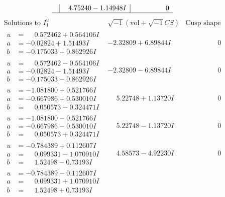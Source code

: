 \documentclass[1p]{elsarticle_modified}
\theoremstyle{definition}
\newcommand{\I}{\sqrt{-1}}
\begin{document}
$$\begin{array}{c|c|c}
 & \phantom{-}4.75240 - 1.14948 I & \phantom{-0.000000 } 0\\
 \hline 
 \end{array}$$\newpage$$\begin{array}{c|c|c}  
\text{Solutions to }I^u_{1}& \I (\text{vol} + \sqrt{-1}CS) & \text{Cusp shape}\\
 \hline 
\begin{aligned}
u &= \phantom{-}0.572462 + 0.564106 I \\
a &= -0.02824 + 1.51493 I \\
b &= -0.175033 + 0.862926 I\end{aligned}
 & -2.32809 + 6.89844 I & \phantom{-0.000000 } 0 \\ \hline\begin{aligned}
u &= \phantom{-}0.572462 - 0.564106 I \\
a &= -0.02824 - 1.51493 I \\
b &= -0.175033 - 0.862926 I\end{aligned}
 & -2.32809 - 6.89844 I & \phantom{-0.000000 } 0 \\ \hline\begin{aligned}
u &= -1.081800 + 0.521766 I \\
a &= -0.667986 + 0.530010 I \\
b &= \phantom{-}0.050573 - 0.324471 I\end{aligned}
 & \phantom{-}5.22748 + 1.13720 I & \phantom{-0.000000 } 0 \\ \hline\begin{aligned}
u &= -1.081800 - 0.521766 I \\
a &= -0.667986 - 0.530010 I \\
b &= \phantom{-}0.050573 + 0.324471 I\end{aligned}
 & \phantom{-}5.22748 - 1.13720 I & \phantom{-0.000000 } 0 \\ \hline\begin{aligned}
u &= -0.784389 + 0.112607 I \\
a &= \phantom{-}0.099331 - 1.070910 I \\
b &= \phantom{-}1.52498 - 0.73193 I\end{aligned}
 & \phantom{-}4.58573 - 4.92230 I & \phantom{-0.000000 } 0 \\ \hline\begin{aligned}
u &= -0.784389 - 0.112607 I \\
a &= \phantom{-}0.099331 + 1.070910 I \\
b &= \phantom{-}1.52498 + 0.73193 I\end{aligned}

\end{array}$$
\end{document}

